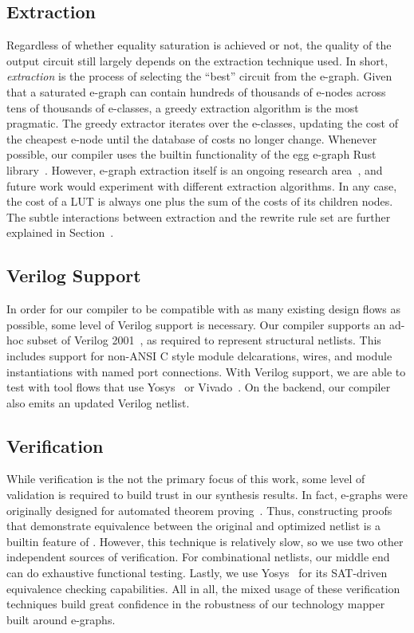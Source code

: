 \subsection{Extraction}\label{sec:flow:extraction}
Regardless of whether equality saturation is achieved or not, the quality of
the output circuit still largely depends on the extraction technique used. In
short, \textit{extraction} is the process of selecting the ``best'' circuit
from the e-graph. Given that a saturated e-graph can contain hundreds of
thousands of e-nodes across tens of thousands of e-classes, a greedy extraction
algorithm is the most pragmatic. The greedy extractor iterates over the
e-classes, updating the cost of the cheapest e-node until the database of costs
no longer change. Whenever possible, our compiler uses the builtin
functionality of the egg e-graph Rust library~\cite{docsEgg}. However, e-graph
extraction itself is an ongoing research area~\cite{smoothe,
    sparsextract,esynth}, and future work would experiment with different
extraction algorithms. In any case, the cost of a LUT is always one plus the
sum of the costs of its children nodes. The subtle interactions between
extraction and the rewrite rule set are further explained in
Section~.

\subsection{Verilog Support}\label{sec:flow:verilog}
In order for our compiler to be compatible with as many existing design flows
as possible, some level of Verilog support is necessary. Our compiler supports
an ad-hoc subset of Verilog 2001~\cite{verilog}, as required to represent
structural netlists. This includes support for non-ANSI C style module
delcarations, wires, and module instantiations with named port connections.
With Verilog support, we are able to test \shortname{} with tool flows that use
Yosys~\cite{yosys} or Vivado~\cite{vivado}. On the backend, our compiler also
emits an updated Verilog netlist.

\subsection{Verification}\label{sec:flow:verification}
While verification is the not the primary focus of this work, some level of
validation is required to build trust in our synthesis results. In fact,
e-graphs were originally designed for automated theorem
proving~\cite{eggpaper}. Thus, constructing proofs that demonstrate equivalence
between the original and optimized netlist is a builtin feature of
\shortname{}. However, this technique is relatively slow, so we use two other
independent sources of verification. For combinational netlists, our middle end
can do exhaustive functional testing. Lastly, we use Yosys~\cite{yosys} for its
SAT-driven equivalence checking capabilities. All in all, the mixed usage of
these verification techniques build great confidence in the robustness of our
technology mapper built around e-graphs.